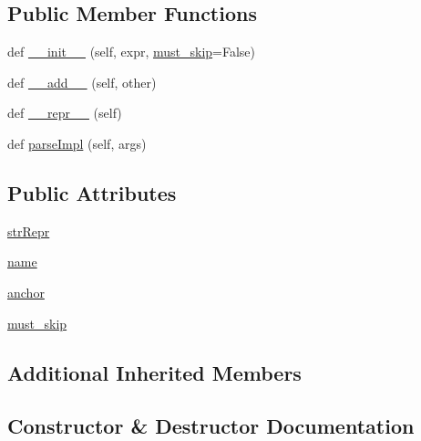 \subsection*{Public Member Functions}
\begin{DoxyCompactItemize}
\item 
def \hyperlink{classpyparsing_1_1__PendingSkip_aae5c1274aa8d6c61538ff727b25b71a9}{\+\_\+\+\_\+init\+\_\+\+\_\+} (self, expr, \hyperlink{classpyparsing_1_1__PendingSkip_a787f46b01372b8b89f0d3e13c2cdf9ae}{must\+\_\+skip}=False)
\item 
def \hyperlink{classpyparsing_1_1__PendingSkip_ada8fae50ac1e667d724b2fbfd6e0509d}{\+\_\+\+\_\+add\+\_\+\+\_\+} (self, other)
\item 
def \hyperlink{classpyparsing_1_1__PendingSkip_acb199f1b698b4df685d4511f88bb3ec8}{\+\_\+\+\_\+repr\+\_\+\+\_\+} (self)
\item 
def \hyperlink{classpyparsing_1_1__PendingSkip_a96fba83640f555305bdc027a642b9688}{parse\+Impl} (self, args)
\end{DoxyCompactItemize}
\subsection*{Public Attributes}
\begin{DoxyCompactItemize}
\item 
\hyperlink{classpyparsing_1_1__PendingSkip_a782b316aac786f7ebaf348e08f11f080}{str\+Repr}
\item 
\hyperlink{classpyparsing_1_1__PendingSkip_a528cd3ed66e500cc4518ed9ae23e1da9}{name}
\item 
\hyperlink{classpyparsing_1_1__PendingSkip_aeef91dcd523933dd370fbe45a5b9b63b}{anchor}
\item 
\hyperlink{classpyparsing_1_1__PendingSkip_a787f46b01372b8b89f0d3e13c2cdf9ae}{must\+\_\+skip}
\end{DoxyCompactItemize}
\subsection*{Additional Inherited Members}


\subsection{Constructor \& Destructor Documentation}
\mbox{\label{classpyparsing_1_1__PendingSkip_aae5c1274aa8d6c61538ff727b25b71a9}} 
